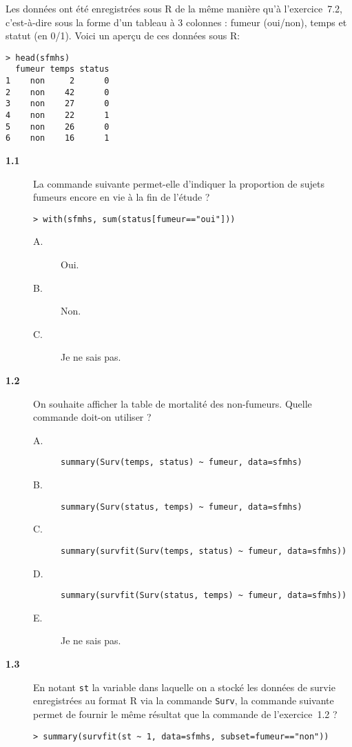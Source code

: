 \documentclass[11pt]{report}
\theoremstyle{definition}
\newcommand{\R}{\textsf{R}\xspace}
\begin{document}
Les données ont été enregistrées sous \R de la même manière qu'à
l'exercice~7.2, c'est-à-dire sous la forme d'un tableau à 3 colonnes :
fumeur (oui/non), temps et statut (en 0/1). Voici un aperçu de
ces données sous \R :
\begin{verbatim}
> head(sfmhs)
  fumeur temps status
1    non     2      0
2    non    42      0
3    non    27      0
4    non    22      1
5    non    26      0
6    non    16      1
\end{verbatim}
\begin{description}
\item[\bf 1.1]  La commande suivante permet-elle
  d'indiquer la proportion de sujets fumeurs encore en vie à la fin de
  l'étude ?
\begin{verbatim}
> with(sfmhs, sum(status[fumeur=="oui"])) 
\end{verbatim}
  \begin{description}
  \item[A.] Oui.
  \item[B.] Non.
  \item[C.] Je ne sais pas.
  \end{description}
\item[\bf 1.2]  On souhaite afficher la table de
  mortalité des non-fumeurs. Quelle commande doit-on utiliser ?
  \begin{description}
  \item[A.] \verb|summary(Surv(temps, status) ~ fumeur, data=sfmhs)|
  \item[B.] \verb|summary(Surv(status, temps) ~ fumeur, data=sfmhs)|
  \item[C.] \verb|summary(survfit(Surv(temps, status) ~ fumeur, data=sfmhs))|
  \item[D.] \verb|summary(survfit(Surv(status, temps) ~ fumeur, data=sfmhs))|
  \item[E.] Je ne sais pas.
  \end{description}
\item[\bf 1.3]  En notant \texttt{st} la variable
  dans laquelle on a stocké les données de survie enregistrées au format \R
  via la commande \texttt{Surv}, la commande suivante permet de fournir le
  même résultat que la commande de l'exercice~1.2 ?
\begin{verbatim}
> summary(survfit(st ~ 1, data=sfmhs, subset=fumeur=="non"))
\end{verbatim}  
  \begin{description}

\end{description}
\end{description}
\end{document}
